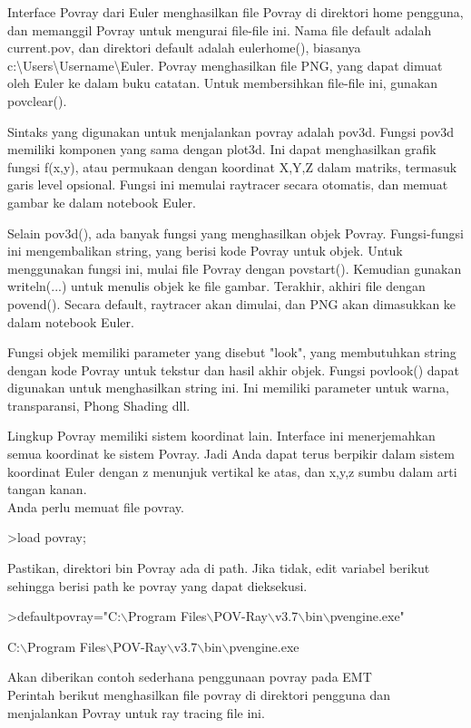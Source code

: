 \documentclass[a4paper,10pt]{article}
\begin{document}
\begin{eulernotebook}
\begin{eulercomment}
\begin{eulercomment}
\begin{eulercomment}
Interface Povray dari Euler menghasilkan file Povray di direktori home
pengguna, dan memanggil Povray untuk mengurai file-file ini. Nama file
default adalah current.pov, dan direktori default adalah eulerhome(),
biasanya c:\textbackslash{}Users\textbackslash{}Username\textbackslash{}Euler. Povray menghasilkan file PNG, yang
dapat dimuat oleh Euler ke dalam buku catatan. Untuk membersihkan
file-file ini, gunakan povclear().

Sintaks yang digunakan untuk menjalankan povray adalah pov3d. Fungsi
pov3d memiliki komponen yang sama dengan plot3d. Ini dapat
menghasilkan grafik fungsi f(x,y), atau permukaan dengan koordinat
X,Y,Z dalam matriks, termasuk garis level opsional. Fungsi ini memulai
raytracer secara otomatis, dan memuat gambar ke dalam notebook Euler.

Selain pov3d(), ada banyak fungsi yang menghasilkan objek Povray.
Fungsi-fungsi ini mengembalikan string, yang berisi kode Povray untuk
objek. Untuk menggunakan fungsi ini, mulai file Povray dengan
povstart(). Kemudian gunakan writeln(...) untuk menulis objek ke file
gambar. Terakhir, akhiri file dengan povend(). Secara default,
raytracer akan dimulai, dan PNG akan dimasukkan ke dalam notebook
Euler.

Fungsi objek memiliki parameter yang disebut "look", yang membutuhkan
string dengan kode Povray untuk tekstur dan hasil akhir objek. Fungsi
povlook() dapat digunakan untuk menghasilkan string ini. Ini memiliki
parameter untuk warna, transparansi, Phong Shading dll.

Lingkup Povray memiliki sistem koordinat lain. Interface ini
menerjemahkan semua koordinat ke sistem Povray. Jadi Anda dapat terus
berpikir dalam sistem koordinat Euler dengan z menunjuk vertikal ke
atas, dan x,y,z sumbu dalam arti tangan kanan.\\
Anda perlu memuat file povray.
\end{eulercomment}
\begin{eulerprompt}
>load povray;
\end{eulerprompt}
\begin{eulercomment}
Pastikan, direktori bin Povray ada di path. Jika tidak, edit variabel
berikut sehingga berisi path ke povray yang dapat dieksekusi.
\end{eulercomment}
\begin{eulerprompt}
>defaultpovray="C:\(\backslash\)Program Files\(\backslash\)POV-Ray\(\backslash\)v3.7\(\backslash\)bin\(\backslash\)pvengine.exe"
\end{eulerprompt}
\begin{euleroutput}
  C:\(\backslash\)Program Files\(\backslash\)POV-Ray\(\backslash\)v3.7\(\backslash\)bin\(\backslash\)pvengine.exe
\end{euleroutput}
\begin{eulercomment}
Akan diberikan contoh sederhana penggunaan povray pada EMT\\
Perintah berikut menghasilkan file povray di direktori pengguna dan
menjalankan Povray untuk ray tracing file ini.


\end{eulercomment}
\end{eulercomment}
\end{eulercomment}
\end{eulernotebook}
\end{document}
